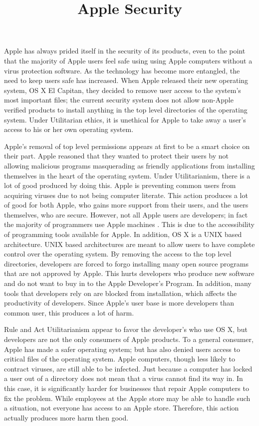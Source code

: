 \documentclass{paper}
\title{Apple Security}
\begin{document}
\drafth{}
\inlinetitle

\begin{linenumbers}

Apple has always prided itself in the security of its products, even to the point that the majority of Apple users feel safe using using Apple computers without a virus protection software. As the technology has become more entangled, the need to keep users safe has increased. When Apple released their new operating system, OS X El Capitan, they decided to remove user access to the system's most important files; the current security system does not allow non-Apple verified products to install anything in the top level directories of the operating system. Under Utilitarian ethics, it is unethical for Apple to take away a user's access to his or her own operating system.

Apple's removal of top level permissions appears at first to be a smart choice on their part. Apple reasoned that they wanted to protect their users by not allowing malicious programs masquerading as friendly applications from installing themselves in the heart of the operating system. Under Utilitarianism, there is a lot of good produced by doing this. Apple is preventing common users from acquiring viruses due to not being computer literate. This action produces a lot of good for both Apple, who gains more support from their users, and the users themselves, who are secure. However, not all Apple users are developers; in fact the majority of programmers use Apple machines \cite{wiki}. This is due to the accessibility of programming tools available for Apple. In addition, OS X is a UNIX based architecture. UNIX based architectures are meant to allow users to have complete control over the operating system. By removing the access to the top level directories, developers are forced to forgo installing many  open source programs that are not approved by Apple. This hurts developers who produce new software and do not want to buy in to the Apple Developer's Program. In addition, many tools that developers rely on are blocked from installation, which affects the productivity of developers. Since Apple's user base is more developers than common user, this produces a lot of harm.

Rule and Act Utilitarianism appear to favor the developer's who use OS X, but developers are not the only consumers of Apple products. To a general consumer, Apple has made a safer operating system; but has also denied users access to critical files of the operating system. Apple computers, though less likely to contract viruses, are still able to be infected. Just because a computer has locked a user out of a directory does not mean that a virus cannot find its way in. In this case, it is significantly harder for businesses that repair Apple computers to fix the problem. While employees at the Apple store may be able to handle such a situation, not everyone has access to an Apple store. Therefore, this action actually produces more harm then good.


\end{linenumbers}
\end{document}
